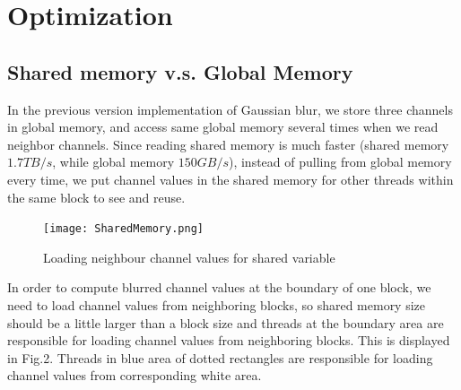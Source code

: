 \documentclass[journal,11pt,onecolumn,draftclsnofoot]{ieeeconf}  %
\begin{document}
\section{Optimization}

\subsection{Shared memory v.s. Global Memory} \label{shared}
In the previous version implementation of Gaussian blur, we store three channels in global memory, and access same global memory several times when we read neighbor channels. Since reading shared memory is much faster (shared memory $1.7TB/s$, while global memory $150GB/s$), instead of pulling from global memory every time, we put channel values in the shared memory for other threads within the same block to see and reuse. 

\begin{figure}[h]
	\centering\texttt{[image: SharedMemory.png]}
	\caption{Loading neighbour channel values for shared variable}
	\label{parallel}
	\vspace*{-5mm}
\end{figure}
In order to compute blurred channel values at the boundary of one block, we need to load channel values from neighboring blocks, so shared memory size should be a little larger than a block size and threads at the boundary area are responsible for loading channel values from neighboring blocks. This is displayed in Fig.2. Threads in blue area of dotted rectangles are responsible for loading channel values from corresponding white area.
\end{document}
